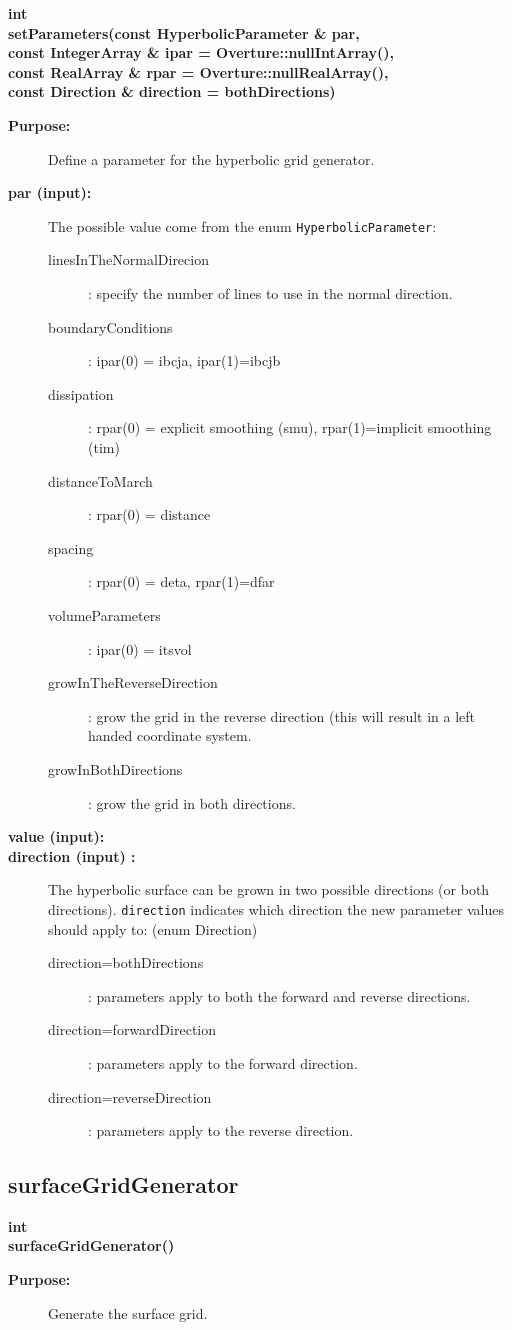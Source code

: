 \begin{flushleft} \textbf{%
int  \\ 
\settowidth{\HyperbolicSurfaceMappingIncludeArgIndent}{setParameters(}%
setParameters(const HyperbolicParameter \& par, \\ 
const IntegerArray \& ipar  = Overture::nullIntArray(), \\ 
const RealArray \& rpar  = Overture::nullRealArray(),\\ 
\hspace{\HyperbolicSurfaceMappingIncludeArgIndent}const Direction \& direction  = bothDirections)
}\end{flushleft}
\begin{description}
\item[{\bf Purpose:}]  
    Define a parameter for the hyperbolic grid generator.
\item[{\bf par (input):}]  The possible value come from the enum {\tt  HyperbolicParameter}:
  \begin{description}
   \item[linesInTheNormalDirecion] : specify the number of lines to use in the normal direction.
   \item[boundaryConditions] : ipar(0) = ibcja, ipar(1)=ibcjb
   \item[dissipation] : rpar(0) = explicit smoothing (smu), rpar(1)=implicit smoothing (tim)
   \item[distanceToMarch] : rpar(0) = distance
   \item[spacing] : rpar(0) = deta, rpar(1)=dfar
   \item[volumeParameters] : ipar(0) = itsvol
   \item[growInTheReverseDirection] : grow the grid in the reverse direction (this will
      result in a left handed coordinate system.
   \item[growInBothDirections] : grow the grid in both directions.
  \end{description}
\item[{\bf value (input):}] 
\item[{\bf direction (input) :}]  The hyperbolic surface can be grown in two possible directions
  (or both directions). {\tt direction} indicates which direction the new parameter 
   values should apply to: (enum Direction)
  \begin{description}
    \item[direction=bothDirections]  : parameters apply to both the forward and reverse directions.
    \item[direction=forwardDirection] : parameters apply to the forward direction.
    \item[direction=reverseDirection] : parameters apply to the reverse direction.
  \end{description}
\end{description}
\subsection{surfaceGridGenerator}
 
\begin{flushleft} \textbf{%
int  \\ 
\settowidth{\HyperbolicSurfaceMappingIncludeArgIndent}{surfaceGridGenerator(}%
surfaceGridGenerator()
}\end{flushleft}
\begin{description}
\item[{\bf Purpose:}]  
    Generate the surface grid.
\end{description}
